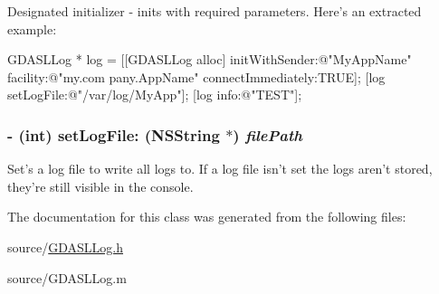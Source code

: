 Designated initializer -\/ inits with required parameters. Here's an extracted example: 
\begin{DoxyCode}
 GDASLLog * log = [[GDASLLog alloc] initWithSender:@"MyAppName" facility:@"my.com
      pany.AppName" connectImmediately:TRUE];
 [log setLogFile:@"/var/log/MyApp"];
 [log info:@"TEST"];
\end{DoxyCode}
 \hypertarget{interface_g_d_a_s_l_log_a60c2903d8fb00b34fafe5c2c1965f811}{
\subsubsection[{setLogFile:}]{\setlength{\rightskip}{0pt plus 5cm}-\/ (int) setLogFile: (NSString $\ast$) {\em filePath}}}
\label{interface_g_d_a_s_l_log_a60c2903d8fb00b34fafe5c2c1965f811}


Set's a log file to write all logs to. If a log file isn't set the logs aren't stored, they're still visible in the console. 

The documentation for this class was generated from the following files:\begin{DoxyCompactItemize}
\item 
source/\hyperlink{_g_d_a_s_l_log_8h}{GDASLLog.h}\item 
source/GDASLLog.m\end{DoxyCompactItemize}
